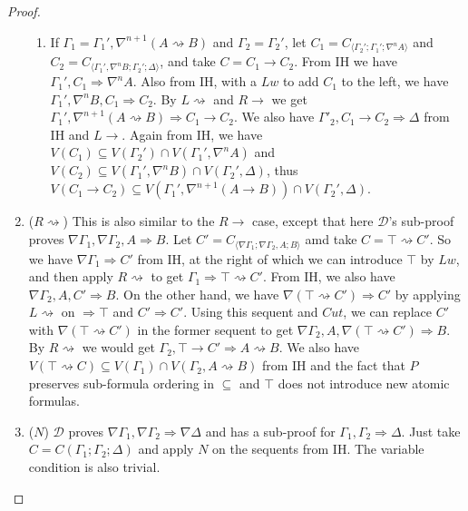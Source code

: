 \documentclass[12pt,a4paper]{article}
\theoremstyle{plain}
\theoremstyle{definition}
\begin{document}
\begin{proof}
\begin{enumerate}
\begin{enumerate}
		\item If $\Gamma_1 = \Gamma_1' , \nabla^{n+1} (A \rightsquigarrow B)$ and $\Gamma_2 = \Gamma_2'$, let $C_1 = C_{\langle\Gamma_2';\Gamma_1';\nabla^n A\rangle}$ and $C_2 = C_{\langle\Gamma_1',\nabla^n B;\Gamma_2';\Delta\rangle}$, and take $C = C_1 \rightarrow C_2$.
		From IH we have $\Gamma_1' , C_1 \Rightarrow \nabla^n A$. Also from IH, with a $Lw$ to add $C_1$ to the left, we have $\Gamma_1' , \nabla^n B , C_1 \Rightarrow C_2$. By $L\rightsquigarrow$ and $R\rightarrow$ we get $\Gamma_1' , \nabla^{n+1} (A \rightsquigarrow B) \Rightarrow C_1 \rightarrow C_2$.
		We also have $\Gamma'_2, C_1 \rightarrow C_2 \Rightarrow \Delta$ from IH and $L\rightarrow$. Again from IH, we have $V(C_1) \subseteq V(\Gamma_2') \cap V(\Gamma_1' , \nabla^n A)$ and $V(C_2) \subseteq V(\Gamma_1' , \nabla^n B) \cap V(\Gamma_2' , \Delta)$, thus $V(C_1 \rightarrow C_2) \subseteq V(\Gamma_1' , \nabla^{n+1} (A \rightarrow B)) \cap V(\Gamma_2' , \Delta)$.
	\end{enumerate}

	\item ($R\rightsquigarrow$) This is also similar to the $R\rightarrow$ case, except that here $\mathcal{D}$'s sub-proof proves $\nabla \Gamma_1 , \nabla \Gamma_2 , A \Rightarrow B$. Let $C' = C_{\langle\nabla\Gamma_1;\nabla\Gamma_2,A;B\rangle}$ amd take $C = \top \rightsquigarrow C'$. So we have $\nabla \Gamma_1 \Rightarrow C'$ from IH, at the right of which we can introduce $\top$ by $Lw$, and then apply $R\rightsquigarrow$ to get $\Gamma_1 \Rightarrow \top \rightsquigarrow C'$. From IH, we also have $\nabla \Gamma_2, A, C' \Rightarrow B$. On the other hand, we have $\nabla (\top \rightsquigarrow C') \Rightarrow C'$ by applying $L\rightsquigarrow$ on $\Rightarrow \top$ and $C' \Rightarrow C'$. Using this sequent and $Cut$, we can replace $C'$ with $\nabla (\top \rightsquigarrow C')$ in the former sequent to get $\nabla \Gamma_2 , A , \nabla (\top \rightsquigarrow C') \Rightarrow B$. By $R\rightsquigarrow$ we would get $\Gamma_2 , \top \rightarrow C' \Rightarrow A \rightsquigarrow B$.
	We also have $V(\top \rightsquigarrow C) \subseteq V(\Gamma_1) \cap V(\Gamma_2 , A \rightsquigarrow B)$ from IH and the fact that $P$ preserves sub-formula ordering in $\subseteq$ and $\top$ does not introduce new atomic formulas.

	\item ($N$) $\mathcal{D}$ proves $\nabla \Gamma_1 , \nabla \Gamma_2 \Rightarrow \nabla \Delta$ and has a sub-proof for $\Gamma_1 , \Gamma_2 \Rightarrow \Delta$. Just take $C = C(\Gamma_1;\Gamma_2;\Delta)$ and apply $N$ on the sequents from IH. The variable condition is also trivial.
	

\end{enumerate}
\end{proof}
\end{document}
